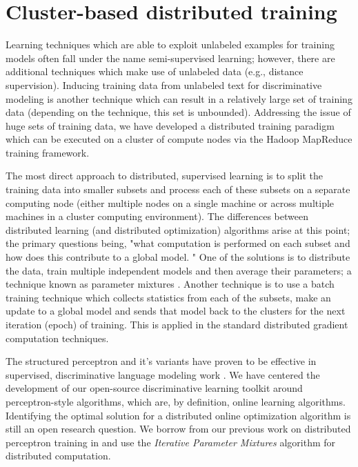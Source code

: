 \documentclass[a4paper]{article}
\let\textquotedbl="
\begin{document}
\section{Cluster-based distributed training}

Learning techniques which are able to exploit unlabeled examples for
training models often fall under the name semi-supervised learning;
however, there are additional techniques which make use of unlabeled
data (e.g., distance supervision\cite{mintz09}). Inducing training
data from unlabeled text for discriminative modeling is another technique which
can result in a relatively large set of training data (depending on the
technique, this set is unbounded). Addressing the issue of huge sets of training
data, we have developed a distributed training paradigm which can be executed on
a cluster of compute nodes via the Hadoop MapReduce training framework.

The most direct approach to distributed, supervised learning is to
split the training data into smaller subsets and process each of these
subsets on a separate computing node (either multiple nodes on a single
machine or across multiple machines in a cluster computing environment).
The differences between distributed learning (and distributed optimization)
algorithms arise at this point; the primary questions being,
 \textquotedbl{}what computation is performed on each subset and how does this
contribute to a global model.  \textquotedbl{}
One of the solutions is to distribute the data, train multiple
independent models and then average their parameters; a technique known
as parameter mixtures \cite{gmann2009}. Another technique is to use a batch training
technique which collects statistics from each of the subsets, make
an update to a global model and sends that model back to the clusters
for the next iteration (epoch) of training. This is applied in the
standard distributed gradient computation techniques.

The structured perceptron \cite{Collins02b} and it's variants have proven to
be effective in supervised, discriminative language modeling work
\cite{Roark07}.  We have centered the development of 
our open-source discriminative learning toolkit around perceptron-style
algorithms, which are, by definition, online learning algorithms. Identifying the
optimal solution for a distributed online optimization algorithm is still an open
research question. We borrow from our previous work on distributed perceptron
training in \cite{mcdonald10distributed,hall10distributed} and use the
\emph{Iterative Parameter Mixtures} algorithm for distributed computation.
\end{document}
